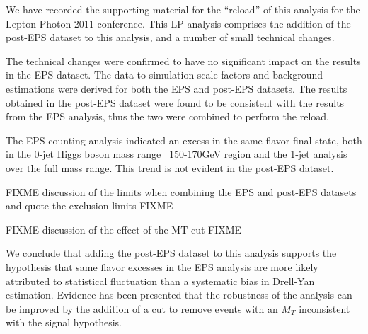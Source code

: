 
We have recorded the supporting material for the
``reload'' of this analysis for the Lepton Photon 2011 conference.
This LP analysis comprises the addition of the post-EPS dataset
to this analysis, and a number of small technical changes.

The technical changes were confirmed to have no significant 
impact on the results in the EPS dataset.  
The data to simulation scale factors and background estimations
were derived for both the EPS and post-EPS datasets.
The results obtained in the post-EPS dataset were found to be
consistent with the results from the EPS analysis, thus
the two were combined to perform the reload.

The EPS counting analysis indicated an excess in the same flavor final state,
both in the 0-jet Higgs boson mass range ~150-170GeV region
and the 1-jet analysis over the full mass range.
This trend is not evident in the post-EPS dataset.

FIXME discussion of the limits when combining the 
EPS and post-EPS datasets and quote the exclusion limits FIXME

FIXME discussion of the effect of the MT cut FIXME

We conclude that adding the post-EPS dataset to this analysis 
supports the hypothesis that same flavor excesses in the EPS
analysis are more likely attributed to statistical fluctuation
than a systematic bias in Drell-Yan estimation.
Evidence has been presented that the robustness of the analysis 
can be improved by the addition of a cut to remove events
with an $M_T$ inconsistent with the signal hypothesis.

